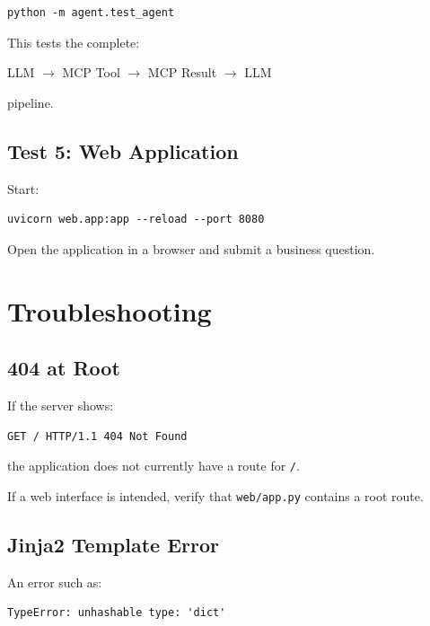 \documentclass[11pt,a4paper]{article}
\begin{document}
\begin{lstlisting}[style=terminal]
python -m agent.test_agent
\end{lstlisting}

This tests the complete:

\begin{center}
LLM $\rightarrow$ MCP Tool $\rightarrow$ MCP Result $\rightarrow$ LLM
\end{center}

pipeline.

\subsection{Test 5: Web Application}

Start:

\begin{lstlisting}[style=terminal]
uvicorn web.app:app --reload --port 8080
\end{lstlisting}

Open the application in a browser and submit a business question.

\section{Troubleshooting}

\subsection{404 at Root}

If the server shows:

\begin{lstlisting}[style=terminal]
GET / HTTP/1.1 404 Not Found
\end{lstlisting}

the application does not currently have a route for \texttt{/}.

If a web interface is intended, verify that \texttt{web/app.py}
contains a root route.

\subsection{Jinja2 Template Error}

An error such as:

\begin{lstlisting}[style=terminal]
TypeError: unhashable type: 'dict'
\end{lstlisting}
\end{document}
